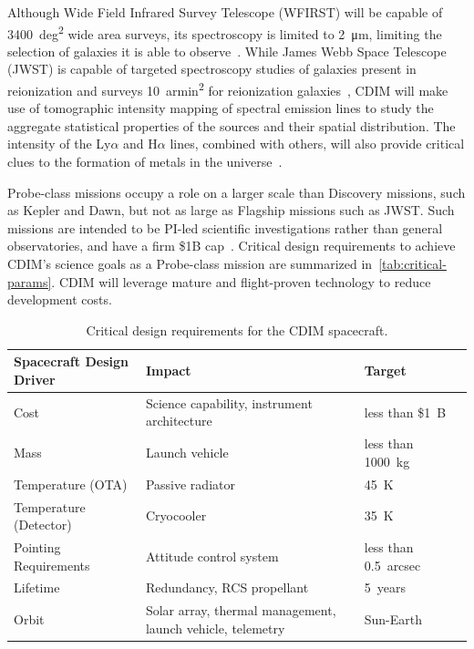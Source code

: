 \documentclass{ws-jai}
\begin{document}
Although Wide Field Infrared Survey Telescope (WFIRST) will be capable of \SI{3400}{deg\squared} wide area surveys, its spectroscopy is limited to \SI{2}{\micro\meter}, limiting the selection of galaxies it is able to observe~\cite{wfirstFinal2012}.
While James Webb Space Telescope (JWST) is capable of targeted spectroscopy studies of galaxies present in reionization and surveys \SI{10}{armin\squared} for reionization galaxies~\cite{Gardner2006}, CDIM will make use of tomographic intensity mapping of spectral emission lines to study the aggregate statistical properties of the sources and their spatial distribution.
The intensity of the Ly$\alpha$ and H$\alpha$ lines, combined with others, will also provide critical clues to the formation of metals in the universe~\cite{cooray2016cdim2page}.

Probe-class missions occupy a role on a larger scale than Discovery missions, such as Kepler and Dawn, but not as large as Flagship missions such as JWST.\@
Such missions are intended to be PI-led scientific investigations rather than general observatories, and have a firm \$1B cap~\cite{probeclasswp}.
Critical design requirements to achieve CDIM's science goals as a Probe-class mission are summarized in~\autoref{tab:critical-params}.
CDIM will leverage mature and flight-proven technology to reduce development costs.

\begin{table}
  \caption{Critical design requirements for the CDIM spacecraft.}
  \small\centering
  \begin{tabular}{@{}llll@{}} \toprule
    Spacecraft Design Driver & Impact & Target \\ \midrule
    Cost & Science capability, instrument architecture & less than \$\SI{1}{B} \\
    Mass & Launch vehicle & less than \SI{1000}{\kilo\gram} \\
    Temperature (OTA) & Passive radiator & \SI{45}{\kelvin} \\
    Temperature (Detector) & Cryocooler & \SI{35}{\kelvin} \\
    Pointing Requirements & Attitude control system & less than \SI{0.5}{arcsec} \\
    Lifetime & Redundancy, RCS propellant & \SI{5}{years} \\
    Orbit & Solar array, thermal management, launch vehicle, telemetry & Sun-Earth \Ltwo{} \\
    \bottomrule
  \end{tabular}
\label{tab:critical-params}
\end{table}
\end{document}
